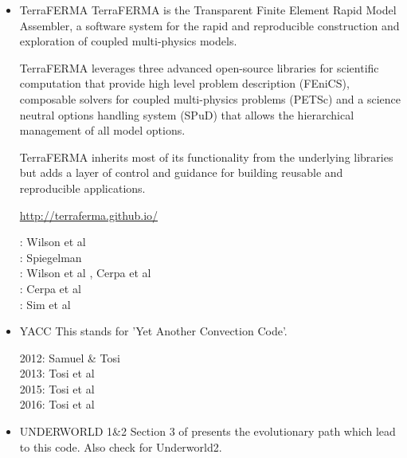 \begin{itemize}
\item {\codefont TerraFERMA} 
TerraFERMA is the Transparent Finite Element Rapid Model Assembler, a software system for the rapid and reproducible construction and exploration of coupled multi-physics models.

TerraFERMA leverages three advanced open-source libraries for scientific computation that provide high level problem description (FEniCS), composable solvers for coupled multi-physics problems (PETSc) and a science neutral options handling system (SPuD) that allows the hierarchical management of all model options.

TerraFERMA inherits most of its functionality from the underlying libraries but adds a layer of control and guidance for building reusable and reproducible applications.

\url{http://terraferma.github.io/}

\begin{scriptsize}
\twothousandfourteen: Wilson et al \cite{wisv14}\\
\twothousandsixteen: Spiegelman \cite{spmw16}\\
\twothousandseventeen: Wilson et al \cite{wisv17}, Cerpa et al \cite{ceww17}\\
\twothousandnineteen: Cerpa et al \cite{ceww19}\\
\twothousandtwenty: Sim et al \cite{siss20}
\end{scriptsize}

\item {\codefont YACC} 
This stands for 'Yet Another Convection Code'.

\begin{scriptsize}
2012: Samuel \& Tosi \cite{sato12}\\
2013: Tosi et al \cite{toyd13}\\
2015: Tosi et al \cite{tosn15}\\
2016: Tosi et al \cite{tomy16}
\end{scriptsize}

\item {\codefont UNDERWORLD 1\&2} 
Section 3 of \cite{qums07} presents the evolutionary path which lead to this code.
Also check \cite{magm20} for Underworld2. 


\end{itemize}
